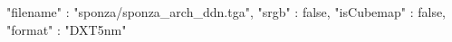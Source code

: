 { 
	"filename" : "sponza/sponza_arch_ddn.tga", 
	"srgb" : false,
	"isCubemap" : false,
	"format" : "DXT5nm"
}